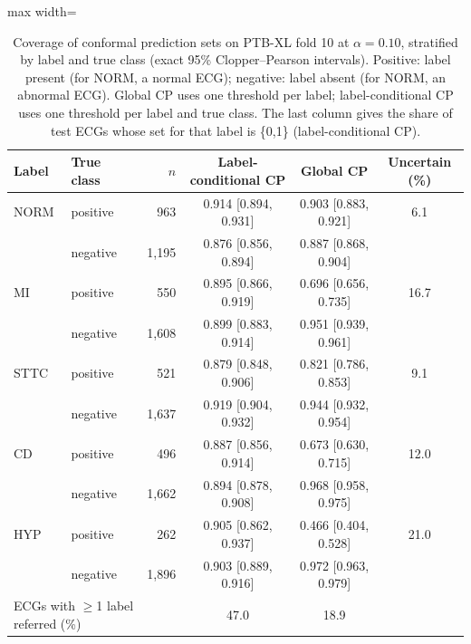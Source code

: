 \begin{table}[!t]
\centering\small
\caption{Coverage of conformal prediction sets on PTB-XL fold 10 at $\alpha=0.10$, stratified by label and true class (exact 95\% Clopper--Pearson intervals). Positive: label present (for NORM, a normal ECG); negative: label absent (for NORM, an abnormal ECG). Global CP uses one threshold per label; label-conditional CP uses one threshold per label and true class. The last column gives the share of test ECGs whose set for that label is \{0,1\} (label-conditional CP).}
\label{tab:conformal}
\setlength{\tabcolsep}{3.5pt}
\begin{adjustbox}{max width=\linewidth}
\begin{tabular}{llrccc}
\toprule
Label & True class & $n$ & Label-conditional CP & Global CP & Uncertain (\%) \\
\midrule
NORM & positive & 963 & 0.914 [0.894, 0.931] & 0.903 [0.883, 0.921] & 6.1 \\
 & negative & 1,195 & 0.876 [0.856, 0.894] & 0.887 [0.868, 0.904] &  \\
MI & positive & 550 & 0.895 [0.866, 0.919] & 0.696 [0.656, 0.735] & 16.7 \\
 & negative & 1,608 & 0.899 [0.883, 0.914] & 0.951 [0.939, 0.961] &  \\
STTC & positive & 521 & 0.879 [0.848, 0.906] & 0.821 [0.786, 0.853] & 9.1 \\
 & negative & 1,637 & 0.919 [0.904, 0.932] & 0.944 [0.932, 0.954] &  \\
CD & positive & 496 & 0.887 [0.856, 0.914] & 0.673 [0.630, 0.715] & 12.0 \\
 & negative & 1,662 & 0.894 [0.878, 0.908] & 0.968 [0.958, 0.975] &  \\
HYP & positive & 262 & 0.905 [0.862, 0.937] & 0.466 [0.404, 0.528] & 21.0 \\
 & negative & 1,896 & 0.903 [0.889, 0.916] & 0.972 [0.963, 0.979] &  \\
\midrule
\multicolumn{3}{l}{ECGs with $\ge$1 label referred (\%)} & 47.0 & 18.9 & \\
\bottomrule
\end{tabular}
\end{adjustbox}
\end{table}
